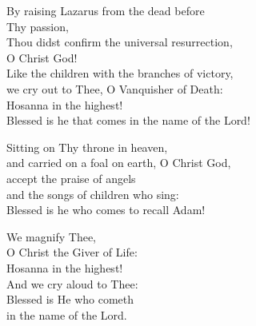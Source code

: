 \documentclass{article}
\begin{document}
%
By raising Lazarus from the dead before \\
        \cont Thy passion, \\
Thou didst confirm the universal resurrection, \\
        \cont O Christ God! \\
Like the children with the branches of victory, \\
we cry out to Thee, O Vanquisher of Death: \\
Hosanna in the highest! \\
Blessed is he that comes in the name of the Lord!

Sitting on Thy throne in heaven, \\
and carried on a foal on earth, O Christ God, \\
accept the praise of angels \\
and the songs of children who sing: \\
Blessed is he who comes to recall Adam!

We magnify Thee, \\
O Christ the Giver of Life: \\
Hosanna in the highest! \\
And we cry aloud to Thee: \\
Blessed is He who cometh \\
in the name of the Lord.
\end{document}
